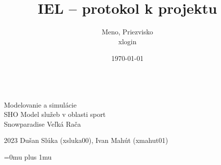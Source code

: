 \documentclass[slovak]{fitiel}
\title{\logo\\IEL -- protokol k projektu}
\author{Meno, Priezvisko \\ xlogin}
\date{\today} %
\begin{document}
	\begin{titlepage}
		\onecolumn
		\begin{center}
			{\logo\\}
			{\LARGE Modelovanie a simulácie\\SHO Model služeb v oblasti sport\\[0.4em] 
			\Huge Snowparadise Veľká Rača}\\
		\end{center}
		{\Large 2023 \hfill Dušan Slúka (xsluka00), Ivan Mahút (xmahut01)}
	\end{titlepage}
	\clearpage
	
	\tableofcontents
	
	\newpage

	 

	 

	

	\pagebreak
	\Urlmuskip=0mu plus 1mu\relax
	
	

	
	
\end{document}

